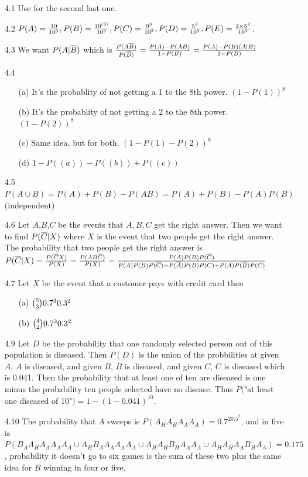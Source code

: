 \documentclass[english, 11pt]{article}
\begin{document}
  \begin{itemize}
    \item[4.1] Use  for the second last one.
    \item[4.2] $P(A) = \frac{10}{10^3}, P(B) = \frac{10^{(3)}}{10^3}, P(C) = \frac{9^3}{10^3}, P(D) = \frac{5^3}{10^3}, P(E) = \frac{2\times5^3}{10^3}$.
    \item[4.3] We want $P(A|\overline{B})$ which is $\frac{P(A\overline{B})}{P(\overline{B})} = \frac{P(A) - P(AB)}{1 - P(B)} = \frac{P(A) - P(B)(A|B)}{1-P(B)}$
    \item[4.4]
    \begin{itemize}
      \item[(a)] It's the probablity of not getting a 1 to the 8th power. $(1-P(1))^8$
      \item[(b)] It's the probablity of not getting a 2 to the 8th power. $(1 - P(2))^8$
      \item[(c)] Same idea, but for both. $(1 - P(1) - P(2))^8$
      \item[(d)] $1 - P((a)) - P((b)) + P((c))$
    \end{itemize}
    \item[4.5] $P(A \cup B) = P(A) + P(B) - P(AB) = P(A) + P(B) - P(A)P(B)$ (independent)
    \item[4.6] Let $A$,$B$,$C$ be the events that $A, B, C$ get the right answer. Then we want to find $P(\overline{C}|X)$ where $X$ is the event that two people get the right answer. The probability that two people get the right answer is $P(\overline{C}|X) = \frac{P(\overline{C}X)}{P(X)} = \frac{P(AB\overline{C})}{P(X)} = \frac{P(A)P(B)P(\overline{C})}{P(A)P(B)P(\overline{C}) + P(\overline{A})P(B)P(C) + P(A)P(\overline{B})P(C)}$
    \item[4.7] Let $X$ be the event that a customer pays with credit card then
    \begin{itemize}
      \item[(a)] ${5 \choose 3} 0.7^3 0.3^2$
      \item[(b)] ${4 \choose 2} 0.7^3 0.3^2$
    \end{itemize}
    \item[4.9] Let $D$ be the probability that one randomly selected person out of this population is diseased. Then $P(D)$ is the union of the probbilities at given $A$, $A$ is diseased, and given $B$, $B$ is diseased, and given $C$, $C$ is diseased which is 0.041. Then the probability that at least one of ten are diseased is one minus the probability ten people selected have no disease. Thus $P($"at least one diseased of 10"$) = 1-(1-0.041)^{10}$.
    \item[4.10] The probability that $A$ sweeps is $P(A_HA_HA_AA_A) = 0.7^20.5^2$, and in five is $P(B_AA_HA_AA_AA_A \cup A_HB_AA_AA_AA_A \cup A_HA_HB_HA_AA_A \cup A_HA_HA_AB_HA_A) = 0.175$, probability it doesn't go to six games is the sum of these two plus the same idea for $B$ winning in four or five.

\end{itemize}
\end{document}
